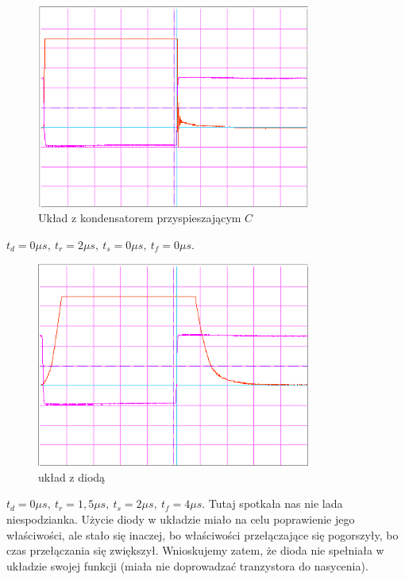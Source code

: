 \documentclass[a4paper,11pt]{article}
\begin{document}
\begin{figure} [H]
  \begin{center}
    \includegraphics[width = 9cm]{../Obrazki_i_tekst/obrobione/II1zkondecprzyspciety.png}
    \caption{Układ z kondensatorem przyspieszającym $C$}
  \end{center}
\end{figure}
\(t_d = 0 \mu s,\ t_r = 2 \mu s,\ t_{s} = 0 \mu s,\ t_{f} = 0 \mu s \).
\begin{figure} [H]
  \begin{center}
    \includegraphics[width = 9cm]{../Obrazki_i_tekst/obrobione/II1zdiodasciety.png}
    \caption{układ z diodą}
  \end{center}
\end{figure}
\(t_d = 0 \mu s,\ t_r = 1,5 \mu s,\ t_{s} = 2 \mu s,\ t_{f} = 4 \mu s \).
Tutaj spotkała nas nie lada niespodzianka. Użycie diody w układzie miało na celu poprawienie jego właściwości, ale stało się inaczej, bo właściwości przełączające się pogorszyły, bo czas przełączania się zwiększył. Wnioskujemy zatem, że dioda nie spełniała w układzie swojej funkcji (miała nie doprowadzać tranzystora do nasycenia).
\end{document}
